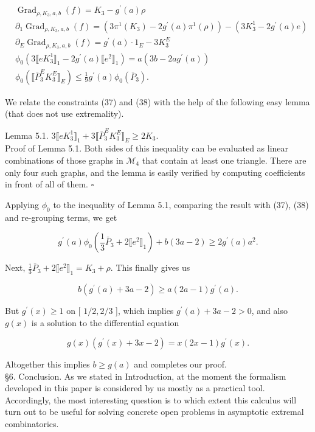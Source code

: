 \documentclass[10pt]{article}
\begin{document}
\begin{align*}
& \operatorname{Grad}_{\rho, K_{3}, a, b}(f)=K_{3}-g^{\prime}(a) \rho \\
& \partial_{1} \operatorname{Grad}_{\rho, K_{3}, a, b}(f)=\left(3 \pi^{1}\left(K_{3}\right)-2 g^{\prime}(a) \pi^{1}(\rho)\right)-\left(3 K_{3}^{1}-2 g^{\prime}(a) e\right) \\
& \partial_{E} \operatorname{Grad}_{\rho, K_{3}, a, b}(f)=g^{\prime}(a) \cdot 1_{E}-3 K_{3}^{E} \\
& \phi_{0}\left(3 \llbracket e K_{3}^{1} \rrbracket_{1}-2 g^{\prime}(a) \llbracket e^{2} \rrbracket_{1}\right)=a\left(3 b-2 a g^{\prime}(a)\right)  \tag{37}\\
& \phi_{0}\left(\llbracket \bar{P}_{3}^{E} K_{3}^{E} \rrbracket_{E}\right) \leq \frac{1}{9} g^{\prime}(a) \phi_{0}\left(\bar{P}_{3}\right) . \tag{38}
\end{align*}


We relate the constraints (37) and (38) with the help of the following easy lemma (that does not use extremality).

Lemma 5.1. $3 \llbracket e K_{3}^{1} \rrbracket_{1}+3 \llbracket \bar{P}_{3}^{E} K_{3}^{E} \rrbracket_{E} \geq 2 K_{3}$.\\
Proof of Lemma 5.1. Both sides of this inequality can be evaluated as linear combinations of those graphs in $\mathcal{M}_{4}$ that contain at least one triangle. There are only four such graphs, and the lemma is easily verified by computing coefficients in front of all of them. \(\square\)

Applying $\phi_{0}$ to the inequality of Lemma 5.1, comparing the result with (37), (38) and re-grouping terms, we get

$$
g^{\prime}(a) \phi_{0}\left(\frac{1}{3} \bar{P}_{3}+2 \llbracket e^{2} \rrbracket_{1}\right)+b(3 a-2) \geq 2 g^{\prime}(a) a^{2} .
$$

Next, $\frac{1}{3} \bar{P}_{3}+2 \llbracket e^{2} \rrbracket_{1}=K_{3}+\rho$. This finally gives us

$$
b\left(g^{\prime}(a)+3 a-2\right) \geq a(2 a-1) g^{\prime}(a) .
$$

But $g^{\prime}(x) \geq 1$ on [ $1 / 2,2 / 3$ ], which implies $g^{\prime}(a)+3 a-2>0$, and also $g(x)$ is a solution to the differential equation

$$
g(x)\left(g^{\prime}(x)+3 x-2\right)=x(2 x-1) g^{\prime}(x) .
$$

Altogether this implies $b \geq g(a)$ and completes our proof.\\
§6. Conclusion. As we stated in Introduction, at the moment the formalism developed in this paper is considered by us mostly as a practical tool. Accordingly, the most interesting question is to which extent this calculus will turn out to be useful for solving concrete open problems in asymptotic extremal combinatorics.
\end{document}
